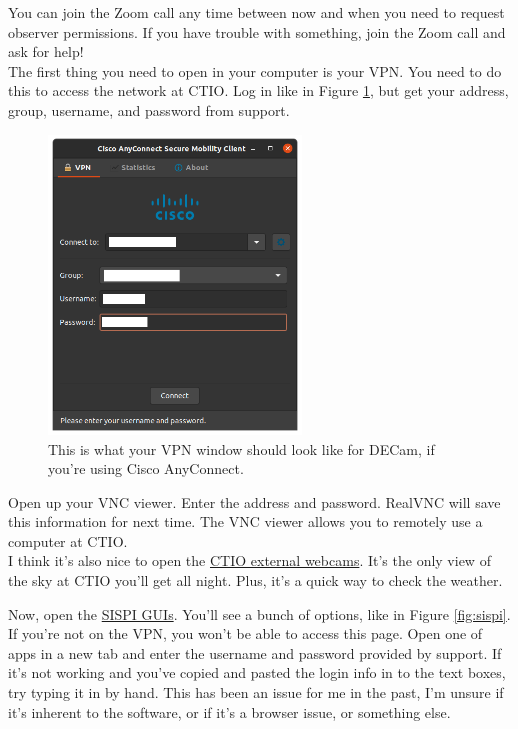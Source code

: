 You can join the Zoom call any time between now and when you need to request observer permissions. If you have trouble with something, join the Zoom call and ask for help! \\

The first thing you need to open in your computer is your VPN. You need to do this to access the network at CTIO. Log in like in Figure \ref{fig:vpn}, but get your address, group, username, and password from support. \\

\begin{figure}[h!]
    \centering
    \includegraphics[width=0.6\textwidth]{figs/observing/vpn.png}
    \caption{This is what your VPN window should look like for DECam, if you're using Cisco AnyConnect.}
    \label{fig:vpn}
\end{figure}

Open up your VNC viewer. Enter the address and password. RealVNC will save this information for next time. The VNC viewer allows you to remotely use a computer at CTIO. \\

I think it's also nice to open the \href{http://www.ctio.noao.edu/noao/content/ctio-external-webcam}{CTIO external webcams}. It's the only view of the sky at CTIO you'll get all night. Plus, it's a quick way to check the weather.\\
\par
Now, open the \href{http://system1.ctio.noao.edu:7001/apps/}{SISPI GUIs}. You'll see a bunch of options, like in Figure \ref{fig:sispi}. If you're not on the VPN, you won't be able to access this page. Open one of apps in a new tab and enter the username and password provided by support. If it's not working and you've copied and pasted the login info in to the text boxes, try typing it in by hand. This has been an issue for me in the past, I'm unsure if it's inherent to the software, or if it's a browser issue, or something else. \\ 

